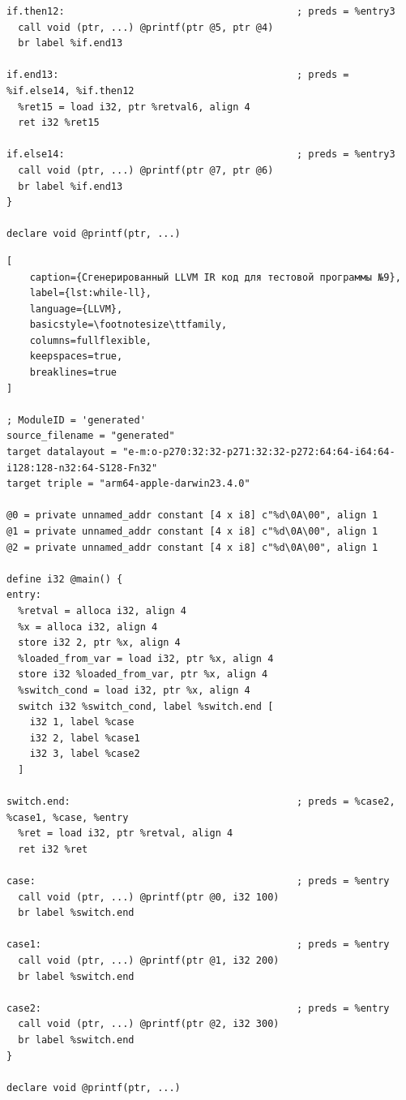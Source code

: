 \begin{lstlisting}
if.then12:                                        ; preds = %entry3
  call void (ptr, ...) @printf(ptr @5, ptr @4)
  br label %if.end13

if.end13:                                         ; preds = %if.else14, %if.then12
  %ret15 = load i32, ptr %retval6, align 4
  ret i32 %ret15

if.else14:                                        ; preds = %entry3
  call void (ptr, ...) @printf(ptr @7, ptr @6)
  br label %if.end13
}

declare void @printf(ptr, ...)

\end{lstlisting}



\begin{lstlisting}[
    caption={Сгенерированный LLVM IR код для тестовой программы №9},
    label={lst:while-ll},
    language={LLVM},
    basicstyle=\footnotesize\ttfamily,
    columns=fullflexible,
    keepspaces=true,
    breaklines=true
]

; ModuleID = 'generated'
source_filename = "generated"
target datalayout = "e-m:o-p270:32:32-p271:32:32-p272:64:64-i64:64-i128:128-n32:64-S128-Fn32"
target triple = "arm64-apple-darwin23.4.0"

@0 = private unnamed_addr constant [4 x i8] c"%d\0A\00", align 1
@1 = private unnamed_addr constant [4 x i8] c"%d\0A\00", align 1
@2 = private unnamed_addr constant [4 x i8] c"%d\0A\00", align 1

define i32 @main() {
entry:
  %retval = alloca i32, align 4
  %x = alloca i32, align 4
  store i32 2, ptr %x, align 4
  %loaded_from_var = load i32, ptr %x, align 4
  store i32 %loaded_from_var, ptr %x, align 4
  %switch_cond = load i32, ptr %x, align 4
  switch i32 %switch_cond, label %switch.end [
    i32 1, label %case
    i32 2, label %case1
    i32 3, label %case2
  ]

switch.end:                                       ; preds = %case2, %case1, %case, %entry
  %ret = load i32, ptr %retval, align 4
  ret i32 %ret

case:                                             ; preds = %entry
  call void (ptr, ...) @printf(ptr @0, i32 100)
  br label %switch.end

case1:                                            ; preds = %entry
  call void (ptr, ...) @printf(ptr @1, i32 200)
  br label %switch.end

case2:                                            ; preds = %entry
  call void (ptr, ...) @printf(ptr @2, i32 300)
  br label %switch.end
}

declare void @printf(ptr, ...)


\end{lstlisting}



